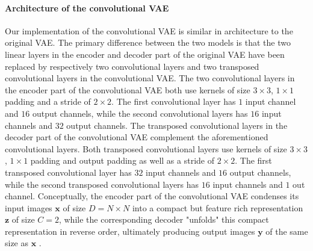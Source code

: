 
\paragraph{Architecture of the convolutional VAE}
Our implementation of the convolutional VAE is similar in architecture to the original VAE\@. The primary difference between the two models is that the two linear layers in the encoder and decoder part of the original VAE have been replaced by respectively two convolutional layers and two transposed convolutional layers in the convolutional VAE\@. The two convolutional layers in the encoder part of the convolutional VAE both use kernels of size $3\times 3$, $1\times 1$ padding and a stride of $2\times2$. The first convolutional layer has $1$ input channel and $16$ output channels, while the second convolutional layers has $16$ input channels and $32$ output channels. \iffalse As such, each convolutional layer decreases the spatial dimensions of their input by a factor of $2$, and the second convolutional layer additionally increases the feature dimension of its input by a factor $2$ to offset the loss in spatial dimensions. \fi The transposed convolutional layers in the decoder part of the convolutional VAE complement the aforementioned convolutional layers. Both transposed convolutional layers use kernels of size $3\times3$, $1\times 1$ padding and output padding as well as a stride of $2\times 2$. The first transposed convolutional layer has $32$ input channels and $16$ output channels, while the second transposed convolutional layers has $16$ input channels and $1$ out channel. \iffalse As such, each transposed convolutional layers "undoes" the spatial reduction produced by a corresponding prior convolutional layer by upsampling the spatial dimensions of its input with a factor of $2$. \fi Conceptually, the encoder part of the convolutional VAE condenses its input images $\bm{x}$ of size $D = N \times N$ into a compact but feature rich representation $\bm{z}$ of size $C = 2$, while the corresponding decoder "unfolds" this compact representation in reverse order, ultimately producing output images $\bm{y}$ of the same size as $\bm{x}$ . 
